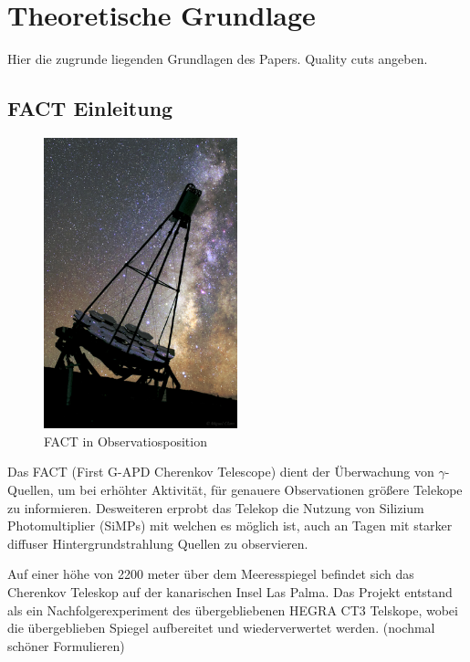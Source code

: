 \chapter{Theoretische Grundlage}
Hier die zugrunde liegenden Grundlagen des Papers.
Quality cuts angeben.

\section{FACT Einleitung}
\begin{figure}
  \includegraphics[width=0.5\textwidth]{./images/FACT.jpg}
  \caption{FACT in Observatiosposition \cite{factpic}}
  \label{fig:observ}
\end{figure}
Das FACT (First G-APD Cherenkov Telescope) dient der Überwachung von $\gamma$-Quellen, um bei erhöhter Aktivität, für genauere Observationen größere Telekope zu informieren. 
Desweiteren erprobt das Telekop die Nutzung von Silizium Photomultiplier (SiMPs) mit welchen es möglich ist, auch an Tagen mit starker diffuser Hintergrundstrahlung Quellen zu observieren. 

Auf einer höhe von 2200 meter über dem Meeresspiegel befindet sich das Cherenkov Teleskop auf der kanarischen Insel Las Palma. 
Das Projekt entstand als ein Nachfolgerexperiment des übergebliebenen HEGRA CT3 Telskope, wobei die übergeblieben Spiegel aufbereitet und wiederverwertet werden. (nochmal schöner Formulieren)

